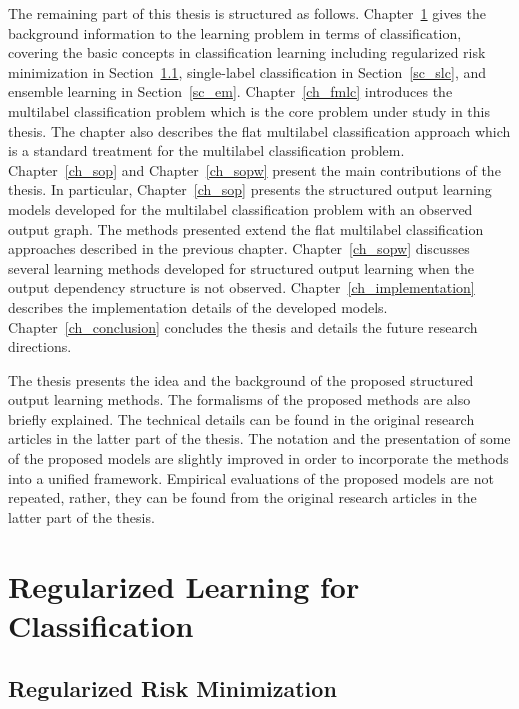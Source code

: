 The remaining part of this thesis is structured as follows.
Chapter~\ref{ch_rlc} gives the background information to the learning problem in terms of classification, covering the basic concepts in classification learning including regularized risk minimization in Section~\ref{sc_rrm}, single-label classification in Section~\ref{sc_slc}, and ensemble learning in Section~\ref{sc_em}.
Chapter~\ref{ch_fmlc} introduces the multilabel classification problem which is the core problem under study in this thesis.
The chapter also describes the flat multilabel classification approach which is a standard treatment for the multilabel classification problem.
Chapter~\ref{ch_sop} and Chapter~\ref{ch_sopw} present the main contributions of the thesis.
In particular, Chapter~\ref{ch_sop} presents the structured output learning models developed for the multilabel classification problem with an observed output graph.
The methods presented extend the flat multilabel classification approaches described in the previous chapter.
Chapter~\ref{ch_sopw} discusses several learning methods developed for structured output learning when the output dependency structure is not observed.
Chapter~\ref{ch_implementation} describes the implementation details of the developed models.
Chapter~\ref{ch_conclusion} concludes the thesis and details the future research directions.

The thesis presents the idea and the background of the proposed structured output learning methods.
The formalisms of the proposed methods are also briefly explained.
The technical details can be found in the original research articles in the latter part of the thesis.
The notation and the presentation of some of the proposed models are slightly improved in order to incorporate the methods into a unified framework.
Empirical evaluations of the proposed models are not repeated, rather, they can be found from the original research articles in the latter part of the thesis.



%
%
%
\chapter{Regularized Learning for Classification} \label{ch_rlc}



%
\section{Regularized Risk Minimization}\label{sc_rrm}

